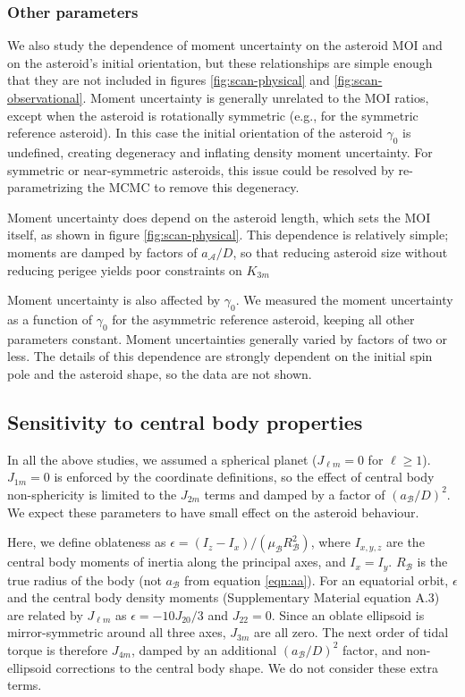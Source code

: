 \documentclass[fleqn,usenatbib]{mnras}
\begin{document}
\subsubsection{Other parameters}

We also study the dependence of moment uncertainty on the asteroid MOI and on the asteroid's initial orientation, but these relationships are simple enough that they are not included in figures \ref{fig:scan-physical} and \ref{fig:scan-observational}. Moment uncertainty is generally unrelated to the MOI ratios, except when the asteroid is rotationally symmetric (e.g., for the symmetric reference asteroid). In this case the initial orientation of the asteroid $\gamma_0$ is undefined, creating degeneracy and inflating density moment uncertainty. For symmetric or near-symmetric asteroids, this issue could be resolved by re-parametrizing the MCMC to remove this degeneracy.

Moment uncertainty does depend on the asteroid length, which sets the MOI itself, as shown in figure  \ref{fig:scan-physical}. This dependence is relatively simple; moments are damped by factors of $a_{\mathcal{A}} / D$, so that reducing asteroid size without reducing perigee yields poor constraints on $K_{3m}$

Moment uncertainty is also affected by $\gamma_0$. We measured the moment uncertainty as a function of $\gamma_0$ for the asymmetric reference asteroid, keeping all other parameters constant. Moment uncertainties generally varied by factors of two or less. The details of this dependence are strongly dependent on the initial spin pole and the asteroid shape, so the data are not shown.

\subsection{Sensitivity to central body properties}
\label{sec:central-body}

In all the above studies, we assumed a spherical planet ($J_{\ell m} = 0$ for $\ell \geq 1$). $J_{1m} = 0$ is enforced by the coordinate definitions, so the effect of central body non-sphericity is limited to the $J_{2m}$ terms and damped by a factor of $(a_\mathcal{B} / D)^2$. We expect these parameters to have small effect on the asteroid behaviour.

Here, we define oblateness as $\epsilon = (I_z - I_x)/(\mu_\mathcal{B} R_\mathcal{B}^2)$, where $I_{x,y,z}$ are the central body moments of inertia along the principal axes, and $I_x = I_y$. $R_\mathcal{B}$ is the true radius of the body (not $a_\mathcal{B}$ from equation \ref{eqn:aa}). For an equatorial orbit, $\epsilon$ and the central body density moments (Supplementary Material equation A.3) are related by $J_{\ell m}$ as $\epsilon = -10J_{20}/3$ and $J_{22} = 0$. Since an oblate ellipsoid is mirror-symmetric around all three axes, $J_{3m}$ are all zero. The next order of tidal torque is therefore $J_{4m}$, damped by an additional $(a_\mathcal{B}/D)^2$ factor, and non-ellipsoid corrections to the central body shape. We do not consider these extra terms.
\end{document}
